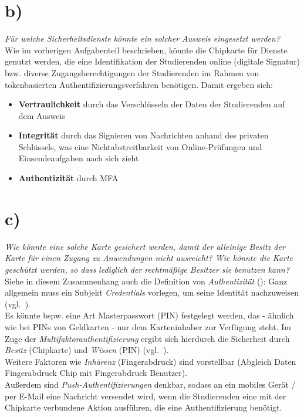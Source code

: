 \section{b)}

\textit{Für welche Sicherheitsdienste könnte ein solcher Ausweis eingesetzt werden?}\\

\noindent
Wie im vorherigen Aufgabenteil beschrieben, könnte die Chipkarte für Dienste genutzt werden, die eine Identifikation der Studierenden online (digitale Signatur) bzw. diverse Zugangsberechtigungen der Studierenden im Rahmen von tokenbasierten Authentifizierungsverfahren benötigen.
Damit ergeben sich:

\begin{itemize}
    \item \textbf{Vertraulichkeit} durch das Verschlüsseln der Daten der Studierenden auf dem Ausweis
    \item \textbf{Integrität} durch das Signieren von Nachrichten anhand des privaten Schlüssels, was eine Nichtabstreitbarkeit von Online-Prüfungen und Einsendeaufgaben nach sich zieht
    \item \textbf{Authentizität} durch MFA
\end{itemize}

\section{c)}

\textit{Wie könnte eine solche Karte gesichert werden, damit der alleinige Besitz der
Karte für einen Zugang zu Anwendungen nicht ausreicht? Wie könnte die Karte geschützt werden, so dass lediglich der rechtmäßige Besitzer sie benutzen kann?}\\

\noindent
Siehe in diesem Zusammenhang auch die Definition von \textit{Authentizität} (\cite[\textbf{Definition 1.4 (Authentizität)}, 8]{Eck18}): Ganz allgemein muss ein Subjekt \textit{Credentials} vorlegen, um seine Identität nachzuweisen (vgl.~\cite[449]{Eck18}).\\
Es könnte bspw. eine Art Masterpasswort (PIN) festgelegt werden, das - ähnlich wie bei PINs von Geldkarten - nur dem Karteninhaber zur Verfügung steht.
Im Zuge der \textit{Multifaktorauthentifizierung} ergibt sich hierdurch die Sicherheit durch \textit{Besitz} (Chipkarte) und \textit{Wissen} (PIN) (vgl.~\cite[24]{ITS1}).\\
Weitere Faktoren wie \textit{Inhärenz} (Fingerabdruck) sind vorstellbar (Abgleich Daten Fingerabdruck Chip mit Fingerabdruck Benutzer).\\
Außerdem sind \textit{Push-Authentifizierungen} denkbar, sodass an ein mobiles Gerät / per E-Mail eine Nachricht versendet wird, wenn die Studierenden eine mit der Chipkarte verbundene Aktion ausführen, die eine Authentifizierung benötigt.\\

